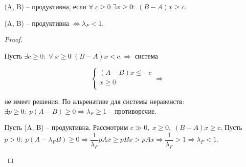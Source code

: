 \begin{definition}
	(A, B) -- продуктивна, если $\forall \; c \geq 0 \; \exists x \geq 0: \; (B - A)x \geq c.$
\end{definition}

\begin{theorem}
	(A, B) -- продуктивна $\Longleftrightarrow \lambda_F < 1.$ 
\end{theorem}

\begin{proof}
	\begin{description}
		\item \fbox{$\Leftarrow$} $\text{Пусть } \exists c \geq 0: \; \forall \; x \geq 0\; (B - A)x < c. \Rightarrow$ система 

		$$\begin{cases}
			(A - B)x \leq -c \\
			x \geq 0\\
		\end{cases} \Rightarrow$$

		не имеет решения. По альренативе для системы неравенств: $\exists p \geq 0: \; p(A - B) \geq 0 \Rightarrow \lambda_F \geq 1$ -- противоречие.

		\item \fbox{$\Rightarrow$} Пусть (A, B) -- продуктивна. Рассмотрим $c \gg 0, \; x \geq 0, \; (B - A)x \geq c.$ Пусть $p > 0: \; p(A - \lambda_F B) \geq 0 \Rightarrow \dfrac{1}{\lambda_F} p A x \geq p B x > p A x \Rightarrow \dfrac{1}{\lambda_F} > 1 \Rightarrow \lambda_F < 1.$

	\end{description}
\end{proof}




